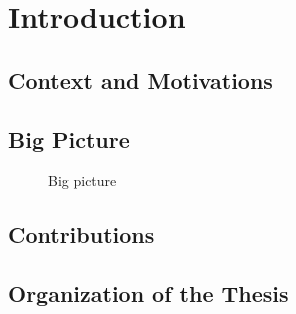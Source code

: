 \chapter{Introduction}
\section{Context and Motivations}
\section{Big Picture}
\begin{figure}
    
    \caption{Big picture}
\end{figure}

\section{Contributions}
\section{Organization of the Thesis}
